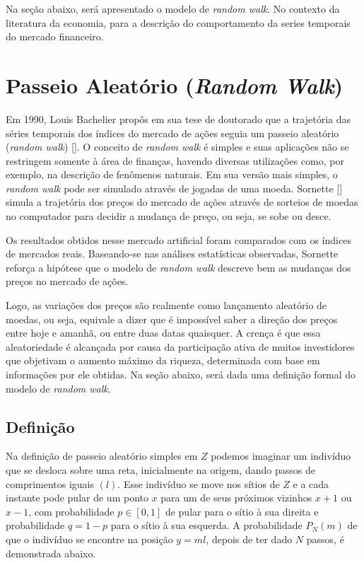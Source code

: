 \documentclass[brazil,ruledheader]{abnt}
\renewcommand{\cite}[1]{[\citeonline{#1}]}
\begin{document}
Na seção abaixo, será apresentado o modelo de \emph{random walk}. No contexto da
literatura da economia, para a descrição do comportamento da series temporais do
mercado financeiro.

\section{Passeio Aleatório (\emph{Random Walk})}

Em 1990, Louis Bachelier propôs em sua tese de doutorado que a trajetória das
séries
temporais dos índices do mercado de ações seguia um passeio aleatório
(\emph{random walk}) \cite{So02}. O conceito de \emph{random walk} é simples e
suas aplicações não se restringem somente à área de finanças, havendo diversas
utilizações como, por exemplo, na descrição de fenômenos naturais. Em sua versão
mais simples, o \emph{random walk} pode ser simulado através de jogadas de uma
moeda. Sornette \cite{So02} simula a trajetória dos preços do mercado de ações
através de sorteios de moedas no computador para decidir a mudança de preço, ou
seja, se sobe ou desce.

Os resultados obtidos nesse mercado artificial foram comparados com os índices
de mercados reais. Baseando-se nas análises estatísticas observadas,
Sornette reforça a hipótese que o modelo de \emph{random walk} descreve bem as
mudanças dos preços no mercado de ações.

Logo, as variações dos preços são realmente como lançamento aleatório de
moedas, ou seja, equivale a dizer que é impossível saber a direção
dos  preços entre hoje e amanhã, ou entre duas datas quaisquer. A crença é
que essa aleatoriedade é alcançada por causa da participação ativa de
muitos investidores que objetivam o aumento máximo da riqueza, 
determinada com base em informações por
ele obtidas. Na seção abaixo, será dada uma definição formal do modelo de
\emph{random walk}.

\subsection{Definição}

Na definição de passeio aleatório simples em $Z$ podemos imaginar um indivíduo
que se desloca sobre uma reta, inicialmente na origem, dando passos de
comprimentos iguais $(l)$. Esse indivíduo se move nos sítios de $Z$ e a cada
instante pode pular de um ponto $x$ para um de seus próximos vizinhos $x + 1$ ou
$x - 1$, com probabilidade $p \in [0,1]$ de pular para o sítio à sua direita e
probabilidade $q=1-p$ para o sítio à sua esquerda.  A probabilidade $P_N(m)$  de
que o indivíduo se encontre na posição $y=ml$, depois de ter dado $N$ passos, é
demonstrada abaixo.
\end{document}
